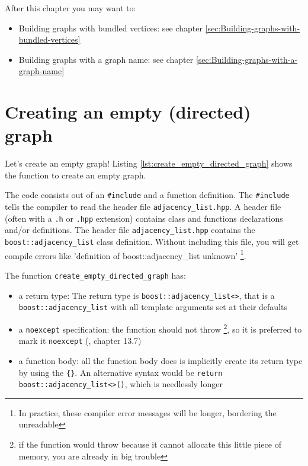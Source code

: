 After this chapter you may want to:

\begin{itemize}
  \item Building graphs with bundled vertices: 
    see chapter \ref{sec:Building-graphs-with-bundled-vertices}
  \item Building graphs with a graph name:
    see chapter \ref{sec:Building-graphs-with-a-graph-name}
\end{itemize}

\section{Creating an empty (directed) graph}
\label{subsec:create_empty_directed_graph}

Let's create an empty graph! 
Listing \ref{lst:create_empty_directed_graph} 
shows the function to create an empty graph.



The code consists out of an \verb;#include; and a function definition.
The \verb;#include; tells the compiler 
to read the header file \verb;adjacency_list.hpp;.
A header file (often with a \verb;.h; or \verb;.hpp; extension) 
contains class and functions declarations and/or definitions.
The header file \verb;adjacency_list.hpp; contains the 
\verb;boost::adjacency_list; class definition.
Without including this file, you will get compile errors like 
'definition of boost::adjacency\_list unknown'
\footnote{
  In practice, these compiler error messages will be longer, bordering the unreadable
}. 

The function \verb;create_empty_directed_graph; has:

\begin{itemize}
  \item a return type: 
    The return type is \verb;boost::adjacency_list<>;, 
    that is a \verb;boost::adjacency_list; 
    with all template arguments set at their defaults
  \item a \verb;noexcept; specification: 
    the function should not throw
    \footnote{
      if the function would throw because it cannot allocate this little piece
      of memory, you are already in big trouble
    }, so it is preferred to mark it \verb;noexcept; 
    (\cite{stroustrup2013}, chapter 13.7)
  \item a function body: 
    all the function body does is implicitly create its return
    type by using the \verb;{};.
    An alternative syntax would be \verb;return boost::adjacency_list<>();,
    which is needlessly longer
\end{itemize}

